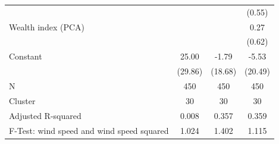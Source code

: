 {\begin{tabular}{l*{3}{c}}
                    &                     &                     &      (0.55)         \\
Wealth index (PCA)  &                     &                     &        0.27         \\
                    &                     &                     &      (0.62)         \\
Constant            &       25.00         &       -1.79         &       -5.53         \\
                    &     (29.86)         &     (18.68)         &     (20.49)         \\
\midrule
N                   &         450         &         450         &         450         \\
Cluster             &          30         &          30         &          30         \\
Adjusted R-squared  &       0.008         &       0.357         &       0.359         \\
F-Test: wind speed and wind speed squared&       1.024         &       1.402         &       1.115         \\
\bottomrule
\end{tabular}
}
